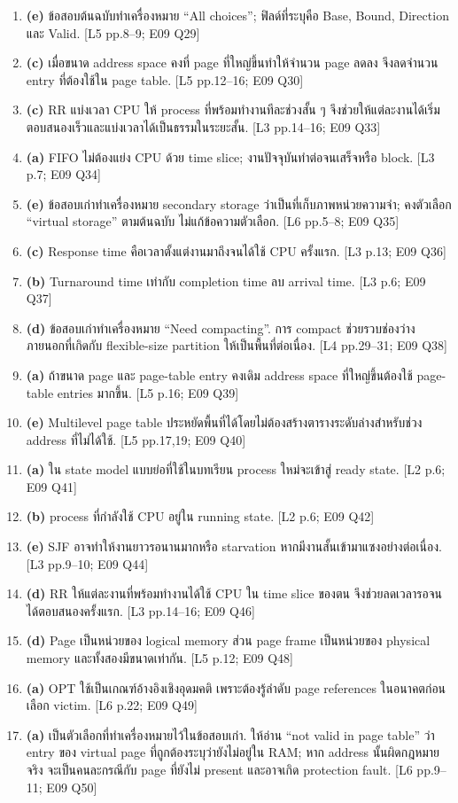 \begin{enumerate}[leftmargin=1.4em,start=1,itemsep=0.14cm]
\item \textbf{(e)} ข้อสอบต้นฉบับทำเครื่องหมาย ``All choices''; ฟิลด์ที่ระบุคือ Base, Bound, Direction และ Valid. {\small [L5 pp.8--9; E09 Q29]}
\item \textbf{(c)} เมื่อขนาด address space คงที่ page ที่ใหญ่ขึ้นทำให้จำนวน page ลดลง จึงลดจำนวน entry ที่ต้องใช้ใน page table. {\small [L5 pp.12--16; E09 Q30]}
\item \textbf{(c)} RR แบ่งเวลา CPU ให้ process ที่พร้อมทำงานทีละช่วงสั้น ๆ จึงช่วยให้แต่ละงานได้เริ่มตอบสนองเร็วและแบ่งเวลาได้เป็นธรรมในระยะสั้น. {\small [L3 pp.14--16; E09 Q33]}
\item \textbf{(a)} FIFO ไม่ต้องแย่ง CPU ด้วย time slice; งานปัจจุบันทำต่อจนเสร็จหรือ block. {\small [L3 p.7; E09 Q34]}
\item \textbf{(e)} ข้อสอบเก่าทำเครื่องหมาย secondary storage ว่าเป็นที่เก็บภาพหน่วยความจำ; คงตัวเลือก ``virtual storage'' ตามต้นฉบับ ไม่แก้ข้อความตัวเลือก. {\small [L6 pp.5--8; E09 Q35]}
\item \textbf{(c)} Response time คือเวลาตั้งแต่งานมาถึงจนได้ใช้ CPU ครั้งแรก. {\small [L3 p.13; E09 Q36]}
\item \textbf{(b)} Turnaround time เท่ากับ completion time ลบ arrival time. {\small [L3 p.6; E09 Q37]}
\item \textbf{(d)} ข้อสอบเก่าทำเครื่องหมาย ``Need compacting''. การ compact ช่วยรวบช่องว่างภายนอกที่เกิดกับ flexible-size partition ให้เป็นพื้นที่ต่อเนื่อง. {\small [L4 pp.29--31; E09 Q38]}
\item \textbf{(a)} ถ้าขนาด page และ page-table entry คงเดิม address space ที่ใหญ่ขึ้นต้องใช้ page-table entries มากขึ้น. {\small [L5 p.16; E09 Q39]}
\item \textbf{(e)} Multilevel page table ประหยัดพื้นที่ได้โดยไม่ต้องสร้างตารางระดับล่างสำหรับช่วง address ที่ไม่ได้ใช้. {\small [L5 pp.17,19; E09 Q40]}
\item \textbf{(a)} ใน state model แบบย่อที่ใช้ในบทเรียน process ใหม่จะเข้าสู่ ready state. {\small [L2 p.6; E09 Q41]}
\item \textbf{(b)} process ที่กำลังใช้ CPU อยู่ใน running state. {\small [L2 p.6; E09 Q42]}
\item \textbf{(e)} SJF อาจทำให้งานยาวรอนานมากหรือ starvation หากมีงานสั้นเข้ามาแซงอย่างต่อเนื่อง. {\small [L3 pp.9--10; E09 Q44]}
\item \textbf{(d)} RR ให้แต่ละงานที่พร้อมทำงานได้ใช้ CPU ใน time slice ของตน จึงช่วยลดเวลารอจนได้ตอบสนองครั้งแรก. {\small [L3 pp.14--16; E09 Q46]}
\item \textbf{(d)} Page เป็นหน่วยของ logical memory ส่วน page frame เป็นหน่วยของ physical memory และทั้งสองมีขนาดเท่ากัน. {\small [L5 p.12; E09 Q48]}
\item \textbf{(a)} OPT ใช้เป็นเกณฑ์อ้างอิงเชิงอุดมคติ เพราะต้องรู้ลำดับ page references ในอนาคตก่อนเลือก victim. {\small [L6 p.22; E09 Q49]}
\item \textbf{(a)} เป็นตัวเลือกที่ทำเครื่องหมายไว้ในข้อสอบเก่า. ให้อ่าน ``not valid in page table'' ว่า entry ของ virtual page ที่ถูกต้องระบุว่ายังไม่อยู่ใน RAM; หาก address นั้นผิดกฎหมายจริง จะเป็นคนละกรณีกับ page ที่ยังไม่ present และอาจเกิด protection fault. {\small [L6 pp.9--11; E09 Q50]}
\end{enumerate}
